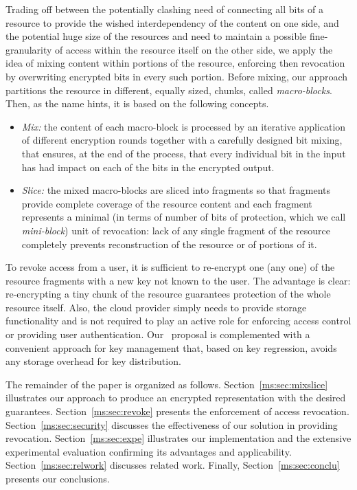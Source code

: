 Trading off between the potentially clashing need of connecting all bits of a resource to provide the wished interdependency of the content on one side, and the potential huge size of the resources and need to maintain a possible fine-granularity of access within the resource itself on the other side, we apply the idea of mixing content within portions of the resource, enforcing then revocation by overwriting encrypted bits in every such portion. Before mixing, our approach partitions the resource in different, equally sized, chunks, called {\em macro-blocks\/}. Then, as the name hints, it is based on the following concepts.

\begin{itemize}

\item {\em Mix:\/} the content of each macro-block is processed by  an iterative application of different encryption rounds together with  a carefully designed bit mixing, that ensures, at the end of the process, that every individual bit in the input has had impact on each of the bits in the encrypted output.

\item {\em Slice:\/} the mixed macro-blocks are sliced into fragments so that  fragments provide complete coverage of the resource content and each fragment represents a minimal (in terms of number of bits of protection, which we call {\em mini-block\/}) unit of revocation: lack of any single fragment of the resource completely prevents reconstruction of the resource or of portions of it.
\end{itemize}

To revoke access from a user, it is sufficient to re-encrypt one (any one) of the resource fragments with a new key not known to the user. The advantage is clear: re-encrypting a tiny chunk of the resource guarantees protection of the whole resource itself. Also, the cloud provider simply needs to provide storage functionality and is not required to play an active role for enforcing access control or providing user authentication. Our \name\ proposal is complemented with a convenient approach for key management that, based on key regression, avoids any storage overhead for key distribution.

\medskip
{}
The remainder of the paper is organized as follows. Section~\ref{ms:sec:mixslice} illustrates our approach to produce an encrypted representation with the desired guarantees. Section~\ref{ms:sec:revoke} presents the enforcement of access revocation. Section~\ref{ms:sec:security} discusses the effectiveness of our solution in providing revocation. Section~\ref{ms:sec:expe} illustrates our implementation and the extensive experimental evaluation confirming its advantages and applicability. Section~\ref{ms:sec:relwork} discusses related work. Finally, Section~\ref{ms:sec:conclu} presents our conclusions.

